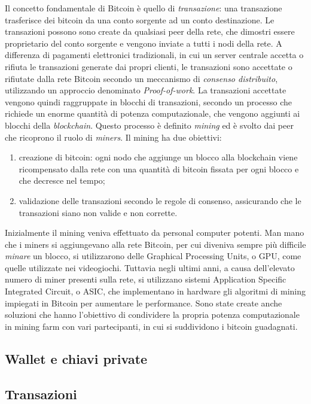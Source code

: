 Il concetto fondamentale di Bitcoin è quello di \emph{transazione}: una transazione trasferisce dei bitcoin da una conto sorgente ad un conto destinazione. Le transazioni possono sono create da qualsiasi peer della rete, che dimostri essere proprietario del conto sorgente e vengono inviate a tutti i nodi della rete. A differenza di pagamenti elettronici tradizionali, in cui un server centrale accetta o rifiuta le transazioni generate dai propri clienti, le transazioni sono accettate o rifiutate dalla rete Bitcoin secondo un meccanismo di \emph{consenso distribuito}, utilizzando un approccio denominato \emph{Proof-of-work}. La transazioni accettate vengono quindi raggruppate in blocchi di transazioni, secondo un processo che richiede un enorme quantità di potenza computazionale, che vengono aggiunti ai blocchi della \emph{blockchain}. Questo processo è definito \emph{mining} ed è svolto dai peer che ricoprono il ruolo di \emph{miners}. Il mining ha due obiettivi:
\begin{enumerate}
	\item creazione di bitcoin: ogni nodo che aggiunge un blocco alla blockchain viene ricompensato dalla rete con una quantità di bitcoin fissata per ogni blocco e che decresce nel tempo;
	\item validazione delle transazioni secondo le regole di consenso, assicurando che le transazioni siano non valide e non corrette.
\end{enumerate}
Inizialmente il mining veniva effettuato da personal computer potenti. Man mano che i miners si aggiungevano alla rete Bitcoin, per cui diveniva sempre più difficile \emph{minare} un blocco, si utilizzarono delle Graphical Processing Units, o GPU, come quelle utilizzate nei videogiochi. Tuttavia negli ultimi anni, a causa dell'elevato numero di miner presenti sulla rete, si utilizzano sistemi Application Specific Integrated Circuit, o ASIC, che implementano in hardware gli algoritmi di mining impiegati in Bitcoin per aumentare le performance. Sono state create anche soluzioni che hanno l'obiettivo di condividere la propria potenza computazionale in mining farm con vari partecipanti, in cui si suddividono i bitcoin guadagnati.

\subsection{Wallet e chiavi private}

\subsection{Transazioni}

